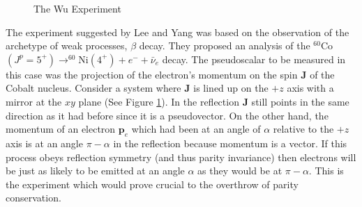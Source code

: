 \documentclass[a4paper,12pt]{book}
\begin{document}
\begin{figure}
\centering
{}
\caption{The Wu Experiment}
\label{fig:wu}
\end{figure}

The experiment suggested by Lee and Yang was based on the observation of the archetype of weak processes, $\beta$ decay. They proposed an analysis of the $^{60}$Co$(J^{p}=5^{+})\longrightarrow ^{60}$Ni$(4^{+})+e^{-}+\bar{\nu}_{e}$ decay. The pseudoscalar to be measured in this case was the projection of the electron's momentum on the spin $\mathbf{J}$ of the Cobalt nucleus. Consider a system where $\mathbf{J}$ is lined up on the $+z$ axis with a mirror at the $xy$ plane (See Figure \ref{fig:wu}). In the reflection $\mathbf{J}$ still points in the same direction as it had before since it is a pseudovector. On the other hand, the momentum of an electron $\mathbf{p}_{e}$ which had been at an angle of $\alpha$ relative to the $+z$ axis is at an angle $\pi - \alpha$ in the reflection because momentum is a vector. If this process obeys reflection symmetry (and thus parity invariance) then electrons will be just as likely to be emitted at an angle $\alpha$ as they would be at $\pi - \alpha$\cite{morii}. This is the experiment which would prove crucial to the overthrow of parity conservation.
\end{document}
